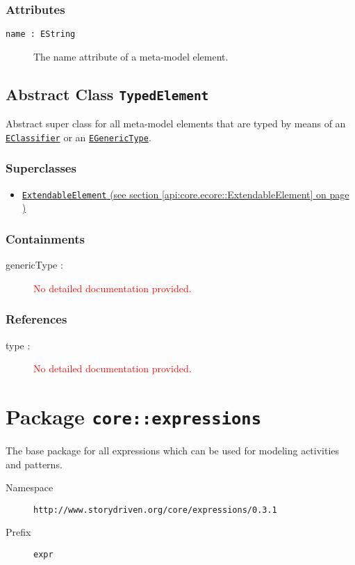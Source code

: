 \subsubsection*{Attributes}
\begin{description}
\item[\texttt{name~:~EString}] The name attribute of a meta-model element.
\end{description}
\subsection{Abstract Class \texttt{TypedElement}}
\label{api:core.ecore::TypedElement}
Abstract super class for all meta-model elements that are typed by means of an \hyperref[EClassifier]{\texttt{EClassifier}} or an \hyperref[EGenericType]{\texttt{EGenericType}}.
\subsubsection*{Superclasses}
\begin{itemize}
\item \hyperref[api:core.ecore::ExtendableElement]{\texttt{ExtendableElement} (see section \ref*{api:core.ecore::ExtendableElement} on page \pageref*{api:core.ecore::ExtendableElement})}
\end{itemize}
\subsubsection*{Containments}
\begin{description}
\item[genericType : ] \textcolor{red}{No detailed documentation provided.}
\end{description}
\subsubsection*{References}
\begin{description}
\item[type : ] \textcolor{red}{No detailed documentation provided.}
\end{description}
\section{Package \texttt{core::expressions}}
\label{api:core.ecore::expressions}
The base package for all expressions which can be used for modeling activities and patterns.
\begin{description}
\item[Namespace] \texttt{http://www.storydriven.org/core/expressions/0.3.1}
\item[Prefix] \texttt{expr}
\end{description}
